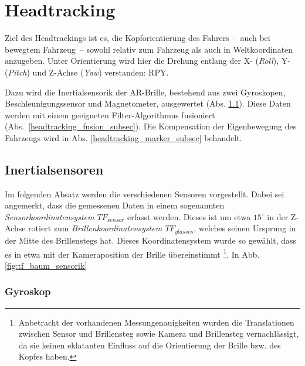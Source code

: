 
\section{Headtracking}

Ziel des Headtrackings ist es, die Kopforientierung des Fahrers --~auch bei bewegtem Fahrzeug~--
sowohl relativ zum Fahrzeug als auch in Weltkoordinaten anzugeben. Unter Orientierung wird hier die Drehung entlang der X- (\emph{Roll}), Y- (\emph{Pitch}) und Z-Achse (\emph{Yaw}) verstanden:
\acs{RPY}.

Dazu wird die Inertialsensorik der \ac{AR}-Brille, bestehend aus zwei Gyroskopen, Beschleunigungssensor und Magnetometer, ausgewertet (Abs. \ref{headtracking_imu_subsec}).
Diese Daten werden mit einem geeigneten Filter-Algorithmus fusioniert (Abs.~\ref{headtracking_fusion_subsec}).
Die Kompensation der Eigenbewegung des Fahrzeugs wird in Abs. \ref{headtracking_marker_subsec} behandelt.

\subsection{Inertialsensoren}
\label{headtracking_imu_subsec}
Im folgenden Absatz werden die verschiedenen Sensoren vorgestellt. Dabei sei angemerkt, dass die gemessenen Daten in einem sogenannten \textit{Sensorkoordinatensystem $TF_{sensor}$} erfasst werden. Dieses ist um etwa $15^\circ$ in der Z-Achse rotiert zum \textit{Brillenkoordinatensystem $TF_{glasses}$}, welches seinen Ursprung in der Mitte des Brillenstegs hat. Dieses Koordinatensystem wurde so gewählt, dass es in etwa mit der Kameraposition der Brille übereinstimmt \footnote{Anbetracht der vorhandenen Messungenauigkeiten wurden die Translationen zwischen Sensor und Brillensteg sowie Kamera und Brillensteg vernachlässigt, da sie keinen eklatanten Einfluss auf die Orientierung der Brille bzw. des Kopfes haben.}. In Abb. \ref{fig:tf_baum_sensorik}


\subsubsection{Gyroskop}
\label{headtracking_imu_gyro_subsubsec}

